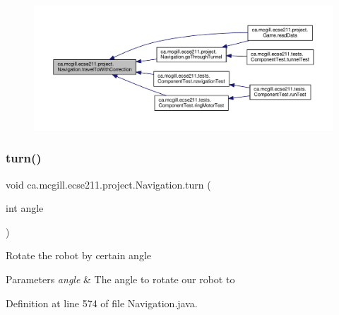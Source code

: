 \begin{figure}[H]
\begin{center}
\leavevmode
\includegraphics[width=350pt]{classca_1_1mcgill_1_1ecse211_1_1project_1_1_navigation_ae7230e905494002087416294f12cae6a_icgraph}
\end{center}
\end{figure}
\mbox{\label{classca_1_1mcgill_1_1ecse211_1_1project_1_1_navigation_ad74286ad36d333bfaf57661837457b76}} 
\subsubsection{\texorpdfstring{turn()}{turn()}}
{\footnotesize\ttfamily void ca.\+mcgill.\+ecse211.\+project.\+Navigation.\+turn (\begin{DoxyParamCaption}\item[{int}]{angle }\end{DoxyParamCaption})}

Rotate the robot by certain angle


\begin{DoxyParams}{Parameters}
{\em angle} & The angle to rotate our robot to \\
\hline
\end{DoxyParams}


Definition at line 574 of file Navigation.\+java.


